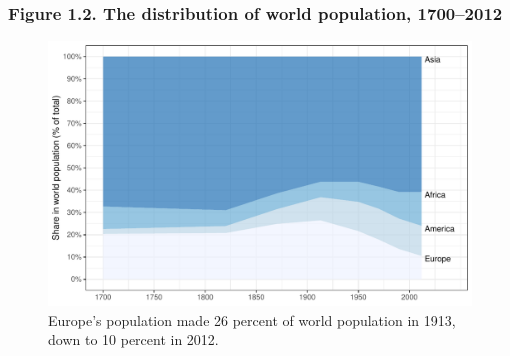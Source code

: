\documentclass[t]{beamer}\usepackage[]{graphicx}\usepackage[]{color}
\newenvironment{knitrout}{}{} %
\begin{document}
\begin{frame}[label=Figure_1_2]
\frametitle{Figure 1.2. The distribution of world population, 1700--2012}
\begin{figure}[t]
\begin{minipage}[b]{\textwidth}
\centering
\begin{knitrout}\footnotesize
{}\color{fgcolor}

{\centering \includegraphics[width=1\linewidth]{figures/color/Figure_1_2} 

}



\end{knitrout}
\caption{Europe's population made 26 percent of world population in 1913, down to 10 percent in 2012.}
\end{minipage}
\end{figure}
\end{frame}
\end{document}
